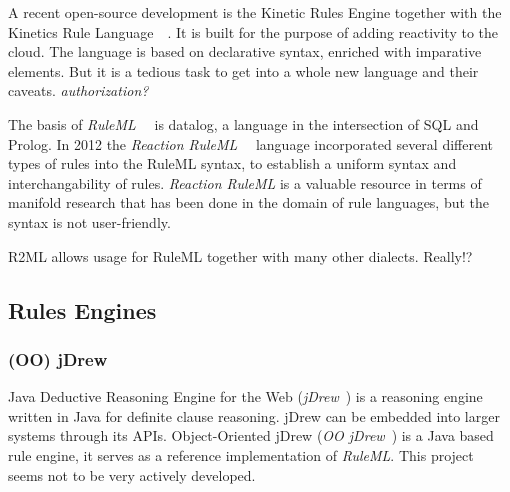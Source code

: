 A recent open-source development is the Kinetic Rules Engine together with the Kinetics Rule Language~~\cite{bookTheLiveWeb}.
It is built for the purpose of adding reactivity to the cloud.
The language is based on declarative syntax, enriched with imparative elements.
But it is a tedious task to get into a whole new language and their caveats.
\emph{authorization?}

The basis of \emph{RuleML}~~\cite{2006-Boley-RuleML.pdf} is datalog, a language in the intersection of SQL and Prolog.
In 2012 the \emph{Reaction RuleML}~~\cite{2012-Paschke_etal-ReactionRuleML.pdf} language incorporated several different types of rules into the RuleML syntax, to establish a uniform syntax and interchangability of rules.
\emph{Reaction RuleML} is a valuable resource in terms of manifold research that has been done in the domain of rule languages, but the syntax is not user-friendly.


R2ML allows usage for RuleML together with many other dialects. Really!?



\subsection{Rules Engines}
\subsubsection{(OO) jDrew}
Java Deductive Reasoning Engine for the Web (\emph{jDrew}~\cite{wwwjdrew}) is a reasoning engine written in Java for definite clause reasoning. jDrew can be embedded into larger systems through its APIs.
Object-Oriented jDrew (\emph{OO jDrew}~\cite{2005-Ball_etal-OOjDrew.pdf,wwwoojdrew}) is a Java based rule engine, it serves as a reference implementation of \emph{RuleML}. This project seems not to be very actively developed.

